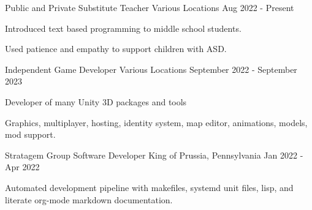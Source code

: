 

\begin{cventries}

  \cventry
    {Public and Private} %
    {Substitute Teacher} %
    {Various Locations} %
    {Aug 2022 - Present} %
    {
      \begin{cvitems} %
        \item {Introduced text based programming to middle school students.}
        \item {Used patience and empathy to support children with ASD.}
      \end{cvitems}
    }

  \cventry
    {Independent} %
    {Game Developer} %
    {Various Locations} %
    {September 2022 - September 2023} %
    {
      \begin{cvitems} %
        \item {Developer of many Unity 3D packages and tools}
        \item {Graphics, multiplayer, hosting, identity system, map editor, animations, models, mod support.}
      \end{cvitems}
    }



  \cventry
    {Stratagem Group} %
    {Software Developer} %
    {King of Prussia, Pennsylvania} %
    {Jan 2022 - Apr 2022} %
    {
      \begin{cvitems} %
        \item {Automated development pipeline with makefiles, systemd unit files, lisp, and literate org-mode markdown documentation.}
      \end{cvitems}
    }


\end{cventries}
